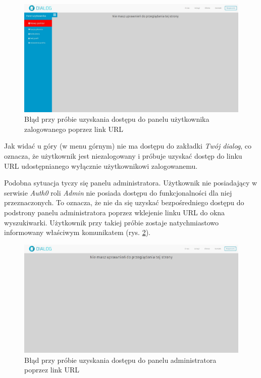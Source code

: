 \newpage

\begin{figure}[h]
	\centering\includegraphics[scale=0.3]{images/no_access.jpg}
	\caption{Błąd przy próbie uzyskania dostępu do panelu użytkownika zalogowanego poprzez link URL}
	\label{Rys:no_access}
\end{figure}

Jak widać u góry (w menu górnym) nie ma dostępu do zakładki \textit{Twój dialog}, co oznacza, że użytkownik jest niezalogowany i próbuje uzyskać dostęp do linku URL udostępnianego wyłącznie użytkownikowi zalogowanemu. 

Podobna sytuacja tyczy się panelu administratora. Użytkownik nie posiadający w serwisie \textit{Auth0} roli \textit{Admin} nie posiada dostępu do funkcjonalności dla niej przeznaczonych. To oznacza, że nie da się uzyskać bezpośredniego dostępu do podstrony panelu administratora poprzez wklejenie linku URL do okna wyszukiwarki. Użytkownik przy takiej próbie zostaje natychmiastowo informowany właściwym komunikatem (rys. \ref{Rys:no_admin_access}).

\begin{figure}[h]
	\centering\includegraphics[scale=0.3]{images/no_admin_access.jpg}
	\caption{Błąd przy próbie uzyskania dostępu do panelu administratora poprzez link URL}
	\label{Rys:no_admin_access}
\end{figure}